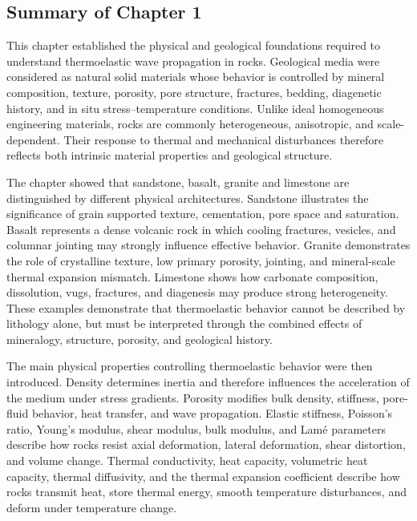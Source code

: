 \subsection{Summary of Chapter 1}

This chapter established the physical and geological foundations required to understand thermoelastic wave propagation in rocks. Geological media were considered as natural solid materials whose behavior is controlled by mineral composition, texture, porosity, pore structure, fractures, bedding, diagenetic history, and in situ stress--temperature conditions. Unlike ideal homogeneous engineering materials, rocks are commonly heterogeneous, anisotropic, and scale-dependent. Their response to thermal and mechanical disturbances therefore reflects both intrinsic material properties and geological structure.

The chapter showed that sandstone, basalt, granite and limestone are distinguished by different physical architectures. Sandstone illustrates the significance of grain supported texture, cementation, pore space and saturation. Basalt represents a dense volcanic rock in which cooling fractures, vesicles, and columnar jointing may strongly influence effective behavior. Granite demonstrates the role of crystalline texture, low primary porosity, jointing, and mineral-scale thermal expansion mismatch. Limestone shows how carbonate composition, dissolution, vugs, fractures, and diagenesis may produce strong heterogeneity. These examples demonstrate that thermoelastic behavior cannot be described by lithology alone, but must be interpreted through the combined effects of mineralogy, structure, porosity, and geological history.

The main physical properties controlling thermoelastic behavior were then introduced. Density determines inertia and therefore influences the acceleration of the medium under stress gradients. Porosity modifies bulk density, stiffness, pore-fluid behavior, heat transfer, and wave propagation. Elastic stiffness, Poisson's ratio, Young's modulus, shear modulus, bulk modulus, and Lamé parameters describe how rocks resist axial deformation, lateral deformation, shear distortion, and volume change. Thermal conductivity, heat capacity, volumetric heat capacity, thermal diffusivity, and the thermal expansion coefficient describe how rocks transmit heat, store thermal energy, smooth temperature disturbances, and deform under temperature change.

